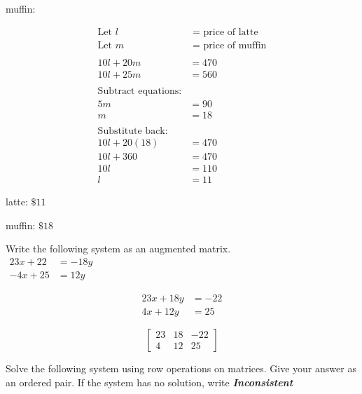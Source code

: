 \documentclass[11pt]{exam}
\begin{document}
\begin{questions}
         muffin: \fillin[][2in]\\
\begin{solution}
\[\begin{aligned} \text{Let } l &\text{ = price of latte} \\ \text{Let } m &\text{ = price of muffin} \\ \\ 10l + 20m &= 470 \\ 10l + 25m &= 560 \\ \\ \text{Subtract equations:} & \\ 5m &= 90 \\ m &= 18 \\ \\ \text{Substitute back:} & \\ 10l + 20(18) &= 470 \\ 10l + 360 &= 470 \\ 10l &= 110 \\ l &= 11 \end{aligned}\]

latte: \(\boxed{ \text{\$} 11 }\)

muffin: \(\boxed{ \text{\$} 18 }\)
\end{solution}

\question[2] 
Write the following system as an augmented matrix.\\

\(\displaystyle{ \begin{aligned} 23x + 22 &= -18y \\ -4x + 25 &= 12y \end{aligned} }\)\\
\begin{solution}
\[\begin{aligned} 23x + 18y &= -22 \\ 4x + 12y &= 25 \end{aligned}\]

\[\boxed{ \left[\begin{array}{cc|c} 23 & 18 & -22 \\ 4 & 12 & 25 \end{array}\right] }\]
\end{solution}

\newpage

\question[5] Solve the following system using row operations on matrices. Give your answer as an ordered pair. If the system has no solution, write \textbf{\textit{Inconsistent}}\\\
\renewcommand{\arraystretch}{1}


\end{questions}
\end{document}
